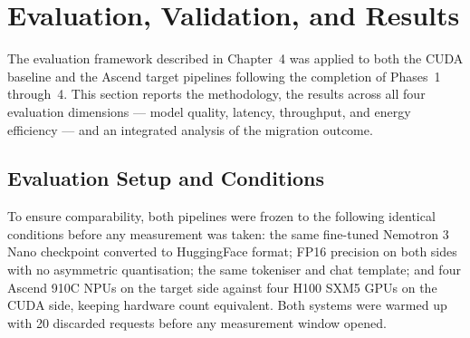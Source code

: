%

\section{Evaluation, Validation, and Results}
\label{sec:evaluation-results}

The evaluation framework described in Chapter~4 was applied
to both the CUDA baseline and the Ascend target pipelines
following the completion of Phases~1 through~4. This section
reports the methodology, the results across all four evaluation
dimensions — model quality, latency, throughput, and energy
efficiency — and an integrated analysis of the migration outcome.

\subsection{Evaluation Setup and Conditions}
\label{subsec:eval-setup}

To ensure comparability, both pipelines were frozen to the
following identical conditions before any measurement was
taken: the same fine-tuned Nemotron 3 Nano checkpoint converted
to HuggingFace format; FP16 precision on both sides with no
asymmetric quantisation; the same tokeniser and chat template;
and four Ascend 910C NPUs on the target side against four H100
SXM5 GPUs on the CUDA side, keeping hardware count equivalent.
Both systems were warmed up with 20 discarded requests before
any measurement window opened.

